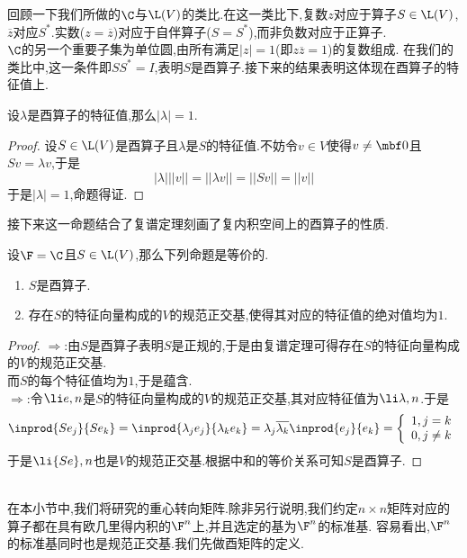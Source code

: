\documentclass{ctexart}
\begin{document}
回顾一下我们所做的$\C$与$\L(V)$的类比.在这一类比下,复数$z$对应于算子$S\in\L(V)$,$\overline{z}$对应$S^*$.实数($z=\overline{z}$)对应于自伴算子($S=S^*$),而非负数对应于正算子.\\
$\C$的另一个重要子集为单位圆,由所有满足$|z|=1$(即$z\overline{z}=1$)的复数组成.%
在我们的类比中,这一条件即$SS^*=I$,表明$S$是酉算子.接下来的结果表明这体现在酉算子的特征值上.
\begin{formal}[2.3 酉算子的特征值]
    设$\lambda$是酉算子的特征值,那么$|\lambda|=1$.
\end{formal}
\begin{proof}
    设$S\in\L(V)$是酉算子且$\lambda$是$S$的特征值.不妨令$v\in V$使得$v\neq\mbf0$且$Sv=\lambda v$,于是
    \[|\lambda|||v||=||\lambda v||=||Sv||=||v||\]
    于是$|\lambda|=1$,命题得证.
\end{proof}\noindent
接下来这一命题结合了复谱定理刻画了复内积空间上的酉算子的性质.
\begin{formal}[2.4 复内积空间上的酉算子]
    设$\F=\C$且$S\in\L(V)$,那么下列命题是等价的.
    \begin{enumerate}[label=\tbf{(\alph*)}]
        \item $S$是酉算子.
        \item 存在$S$的特征向量构成的$V$的规范正交基,使得其对应的特征值的绝对值均为$1$.
    \end{enumerate}
\end{formal}
\begin{proof}
    $\Rightarrow$:由$S$是酉算子表明$S$是正规的,于是由复谱定理可得存在$S$的特征向量构成的$V$的规范正交基.\\
    而$S$的每个特征值均为$1$,于是蕴含.\\
    $\Rightarrow$:令$\li e,n$是$S$的特征向量构成的$V$的规范正交基,其对应特征值为$\li\lambda,n$.于是
    \[\inprod{Se_j}{Se_k}=\inprod{\lambda_je_j}{\lambda_ke_k}=\lambda_j\overline{\lambda_k}\inprod{e_j}{e_k}
    =\left\{\begin{array}{l}
        1,j=k\\0,j\neq k
    \end{array}\right.\]
    于是$\li{Se},n$也是$V$的规范正交基.根据中和的等价关系可知$S$是酉算子.
\end{proof}\noindent
{}\\
在本小节中,我们将研究的重心转向矩阵.除非另行说明,我们约定$n\times n$矩阵对应的算子都在具有欧几里得内积的$\F^n$上,并且选定的基为$\F^n$的标准基.%
容易看出,$\F^n$的标准基同时也是规范正交基.我们先做酉矩阵的定义.
\end{document}
